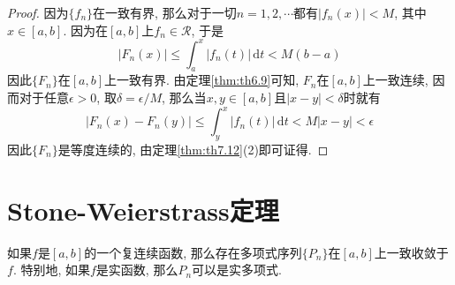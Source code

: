 \documentclass[cn,12pt,math=mtpro2,citestyle=gb7714-2015,bibstyle=gb7714-2015,twocol]{elegantbook}
\newcommand{\dt}{\,\text{d}t}
\newcommand{\RR}{\mathscr{R}}
\begin{document}
\begin{proof}
  因为$\{f_n\}$在一致有界, 那么对于一切$n=1,2,\cdots$都有$|f_n(x)|<M$, 其中$x\in[a,b]$. 因为在$[a,b]$上$f_n\in\RR$, 于是
  $$|F_n(x)|\leq\int_{a}^{x}|f_n(t)|\dt<M(b-a)$$
  因此$\{F_n\}$在$[a,b]$上一致有界. 由定理\ref{thm:th6.9}可知, $F_n$在$[a,b]$上一致连续, 因而对于任意$\epsilon>0$, 取$\delta=\epsilon/M$, 那么当$x,y\in [a,b]$且$|x-y|<\delta$时就有
  $$|F_n(x)-F_n(y)|\leq\int_{y}^{x}|f_n(t)|\dt<M|x-y|<\epsilon$$
  因此$\{F_n\}$是等度连续的, 由定理\ref{thm:th7.12}(2)即可证得.
\end{proof}

\section{Stone-Weierstrass定理}
\begin{theorem}[Weierstrass逼近定理]\label{thm:th7.6}
  如果$f$是$[a,b]$的一个复连续函数, 那么存在多项式序列$\{P_n\}$在$[a,b]$上一致收敛于$f$. 特别地, 如果$f$是实函数, 那么$P_n$可以是实多项式.
\end{theorem}
\end{document}
